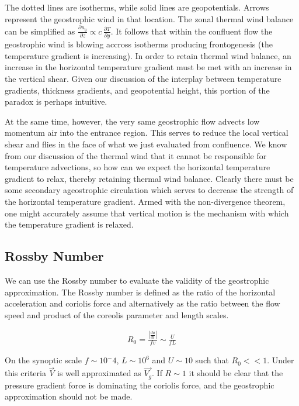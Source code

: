 \documentclass[a4paper,12pt]{article}
\begin{document}
The dotted lines are isotherms, while solid lines are geopotentials. Arrows represent the geostrophic wind in that location. The zonal thermal wind balance can be simplified as $\frac{\partial u_g}{\partial z} \propto c\,\frac{\partial T}{\partial y}$. It follows that within the confluent flow the geostrophic wind is blowing accross isotherms producing frontogenesis (the temperature gradient is increasing). In order to retain thermal wind balance, an increase in the horizontal temperature gradient must be met with an increase in the vertical shear. Given our discussion of the interplay between temperature gradients, thickness gradients, and geopotential height, this portion of the paradox is perhaps intuitive. 

At the same time, however, the very same geostrophic flow advects low momentum air into the entrance region. This serves to reduce the local vertical shear and flies in the face of what we just evaluated from confluence. We know from our discussion of the thermal wind that it cannot be responsible for temperature advections, so how can we expect the horizontal temperature gradient to relax, thereby retaining thermal wind balance. Clearly there must be some secondary ageostrophic circulation which serves to decrease the strength of the horizontal temperature gradient. Armed with the non-divergence theorem, one might accurately assume that vertical motion is the mechanism with which the temperature gradient is relaxed.


\subsection*{Rossby Number}
We can use the Rossby number to evaluate the validity of the geostrophic approximation. The Rossby number is defined as the ratio of the horizontal acceleration and coriolis force and alternatively as the ratio between the flow speed and product of the coreolis parameter and length scales.

\begin{align}
\boxed{R_0 = \frac{|\frac{du}{dt}|}{fv} \sim \frac{U}{fL}}
\end{align}

On the synoptic scale $f \sim 10^-4$, $L \sim 10^6$ and $U \sim 10$ such that $R_0 << 1$. Under this criteria $\vec{V}$ is well approximated as $\vec{V_g}$. If $R \sim 1$ it should be clear that the pressure gradient force is dominating the coriolis force, and the geostrophic approximation should not be made.
\end{document}
